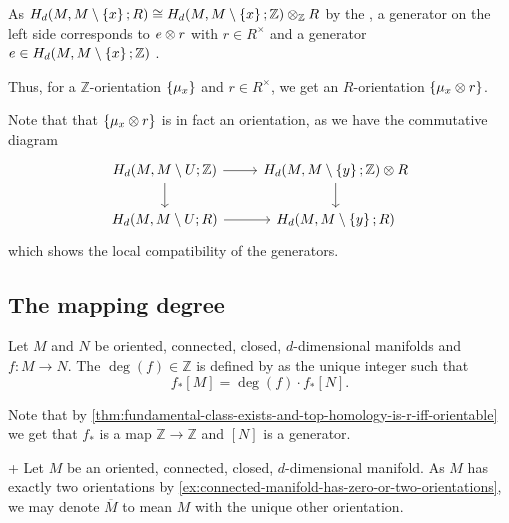 


\begin{remark}
  As
  $H_d(M, M \setminus \left\{  x  \right\}; R)
  \cong
  H_d(M, M \setminus \left\{  x  \right\} ; \mathbb{Z}) \otimes _{\mathbb{Z}} R$
  by the ,
  a generator on the left side corresponds to
  $e\otimes r$ with $r\in R^{\times}$ and a generator
  $e\in H_d(M, M \setminus \left\{  x  \right\} ; \mathbb{Z})$
  .

  Thus, for a $\mathbb{Z}$-orientation $\left\{  \mu_x  \right\} $ and $r\in R^{\times}$,
  we get an $R$-orientation  $\left\{  \mu_x \otimes r \right\} $.

  Note that that $\left\{  \mu_x \otimes r  \right\} $ is in fact an orientation,
  as we have the commutative diagram
  \[
    \begin{tikzcd}
      H_d(M, M \setminus U; \mathbb{Z}) \ar[swap]{d}{} \ar{r}{} & H_d(M, M\setminus \set{ y } ; \mathbb{Z}) \tensor R \ar{d}{} \\
      H_d(M , M \setminus U; R) \ar[swap]{r}{} & H_d(M, M\setminus \set{ y } ; R)
    \end{tikzcd}
  \]
  which shows the local compatibility of the generators.
\end{remark}



\subsection{The mapping degree}

\begin{definition}
  \label{def:mapping-degree-oriented-closed-connected-manifolds}
  Let $M$ and $N$ be oriented, connected, closed,
  $d$-dimensional manifolds and $f\colon M\to N$.
  The  $\deg(f)\in \mathbb{Z}$
  is defined by as the unique integer such that
  \[
    f_*[M] = \deg(f)\cdot f_*[N]
  .\] 
\end{definition}
\begin{well-definedness}
  Note that by
  \autoref{thm:fundamental-class-exists-and-top-homology-is-r-iff-orientable}
  we get that $f_*$ is a map $\mathbb{Z}\to \mathbb{Z}$
  and $[N]$ is a generator.
\end{well-definedness}

\begin{notation}+
  Let $M$ be an oriented, connected,
  closed, $d$-dimensional manifold.
  As $M$ has exactly two orientations by
  \autoref{ex:connected-manifold-has-zero-or-two-orientations},
  we may denote $\overline{M}$ to mean $M$ with the unique
  other orientation.
\end{notation}

